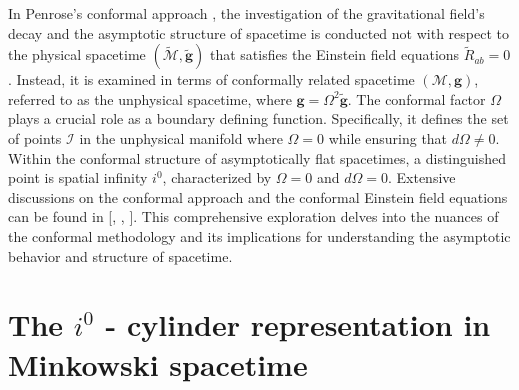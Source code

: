 In Penrose's conformal approach \cite{Pen63}, the investigation of the gravitational field's decay and the asymptotic structure of spacetime is conducted not with respect to the physical spacetime $(\tilde{\mathcal{M}}, \tilde{\boldsymbol{g}})$ that satisfies the Einstein field equations $\tilde{R}_{a b}=0$. Instead, it is examined in terms of conformally related spacetime $(\mathcal{M}, \boldsymbol{g})$, referred to as the unphysical spacetime, where $\boldsymbol{g}=\Omega^2 \tilde{\boldsymbol{g}}$. The conformal factor $\Omega$ plays a crucial role as a boundary defining function. Specifically, it defines the set of points $\mathscr{I}$ in the unphysical manifold where $\Omega = 0$ while ensuring that $d\Omega \neq 0$. \\

Within the conformal structure of asymptotically flat spacetimes, a distinguished point is spatial infinity $i^0$, characterized by $\Omega = 0$ and $d\Omega = 0$. Extensive discussions on the conformal approach and the conformal Einstein field equations can be found in [\cite{Val16}, \cite{Fra04}, \cite{Fri02}]. This comprehensive exploration delves into the nuances of the conformal methodology and its implications for understanding the asymptotic behavior and structure of spacetime.

\section{The $i^0$ - cylinder representation in Minkowski  spacetime}
\label{the $i^0$ cylinder}

